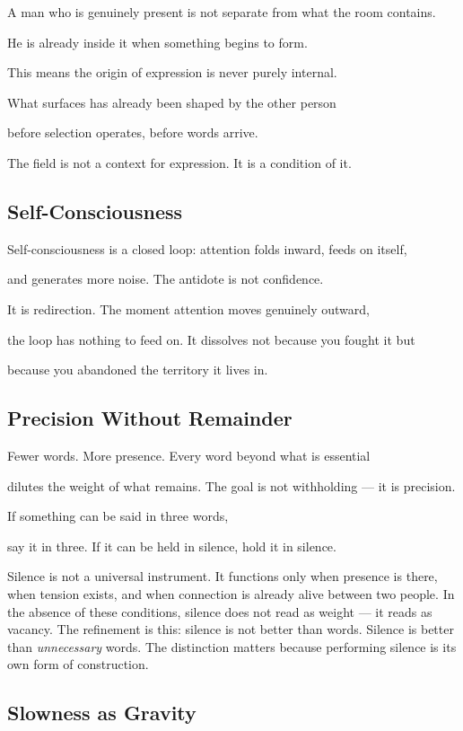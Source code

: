 A man who is genuinely present is not separate from what the room contains.

He is already inside it when something begins to form.

This means the origin of expression is never purely internal.

What surfaces has already been shaped by the other person

before selection operates, before words arrive.

The field is not a context for expression. It is a condition of it.

\subsection{Self-Consciousness}

Self-consciousness is a closed loop: attention folds inward, feeds on itself,

and generates more noise. The antidote is not confidence.

It is redirection. The moment attention moves genuinely outward,

the loop has nothing to feed on. It dissolves not because you fought it but

because you abandoned the territory it lives in.

\subsection{Precision Without Remainder}

Fewer words. More presence. Every word beyond what is essential

dilutes the weight of what remains. The goal is not withholding --- it is precision.

If something can be said in three words,

say it in three. If it can be held in silence, hold it in silence.

Silence is not a universal instrument. It functions only when presence is there, when tension exists, and when connection is already alive between two people. In the absence of these conditions, silence does not read as weight --- it reads as vacancy. The refinement is this: silence is not better than words. Silence is better than \textit{unnecessary} words. The distinction matters because performing silence is its own form of construction.

\subsection{Slowness as Gravity}

